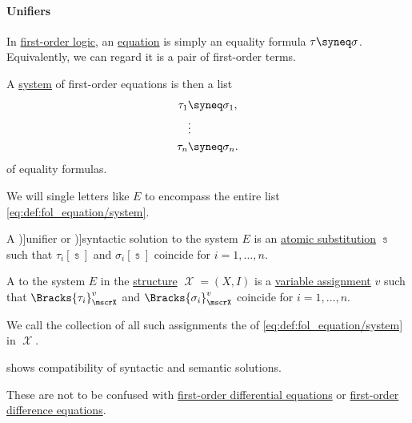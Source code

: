\paragraph{Unifiers}

\begin{definition}\label{def:fol_equation}
  In \hyperref[def:first_order_logic]{first-order logic}, an \hyperref[def:equation]{equation} is simply an equality formula \( \tau \syneq \sigma \). Equivalently, we can regard it is a pair of first-order terms.

  \begin{thmenum}
    \mimprovised A \hyperref[def:system_of_equations]{system} of first-order equations is then a list
    \begin{equation}\label{eq:def:fol_equation/system}
      \begin{aligned}
        \tau_1 &\syneq \sigma_1, \\
               &\vdots \\
        \tau_n &\syneq \sigma_n.
      \end{aligned}
    \end{equation}
    of equality formulas.

    We will single letters like \( E \) to encompass the entire list \eqref{eq:def:fol_equation/system}.

     A \term[ru=унификатор (\cite[def. 4.3.6]{Герасимов2014Вычислимость})]{unifier} or \term[en=solution (\cite[def. 4.5.4]{BaaderNipkow2012TermRewriting})]{syntactic solution} to the system \( E \) is an \hyperref[def:atomic_fol_substitution]{atomic substitution} \( \Bbbs \) such that \( \tau_i[\Bbbs] \) and \( \sigma_i[\Bbbs] \) coincide for \( i = 1, \ldots, n \).

    \mimprovised A  to the system \( E \) in the \hyperref[def:fol_structure]{structure} \( \mscrX = (X, I) \) is a \hyperref[def:fol_variable_assignment]{variable assignment} \( v \) such that \( \Bracks{\tau_i}_\mscrX^v \) and \( \Bracks{\sigma_i}_\mscrX^v \) coincide for \( i = 1, \ldots, n \).

    We call the collection of all such assignments the  of \eqref{eq:def:fol_equation/system} in \( \mscrX \).
  \end{thmenum}
\end{definition}
\begin{comments}
  \item {} shows compatibility of syntactic and semantic solutions.
  \item These are not to be confused with \hyperref[def:differential_equation]{first-order differential equations} or \hyperref[def:difference_equation]{first-order difference equations}.
\end{comments}

